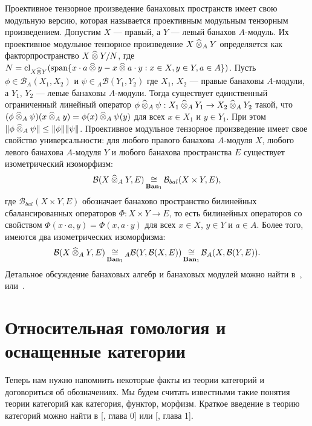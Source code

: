 Проективное тензорное произведение банаховых пространств имеет свою модульную
версию, которая называется проективным модульным тензорным произведением.
Допустим $X$ --- правый, а $Y$ --- левый банахов $A$-модуль. Их проективное
модульное тензорное произведение  $X\mathbin{\widehat{\otimes}}_{A}Y$ определяется как
факторпространство $X\mathbin{\widehat{\otimes}} Y / N$, где $N=\operatorname{cl}_{X\mathbin{\widehat{\otimes}}
Y}(\operatorname{span}\{x\cdot a\mathbin{\widehat{\otimes}} y-x\mathbin{\widehat{\otimes}} a\cdot y:x\in X,y\in
Y,a\in A\})$. Пусть $\phi\in\mathcal{B}_A(X_1,X_2)$ и
$\psi\in{}_A\mathcal{B}(Y_1,Y_2)$ где $X_1$, $X_2$ --- правые банаховы
$A$-модули, а $Y_1$, $Y_2$ --- левые банаховы $A$-модули. Тогда существует
единственный ограниченный линейный оператор $\phi\mathbin{\widehat{\otimes}}_{A}
\psi:X_1\mathbin{\widehat{\otimes}}_{A} Y_1\to X_2\mathbin{\widehat{\otimes}}_{A} Y_2$ такой, что
$(\phi\mathbin{\widehat{\otimes}}_{A} \psi)(x\mathbin{\widehat{\otimes}}_{A} y)=\phi(x)\mathbin{\widehat{\otimes}}_{A} \psi(y)$
для всех $x\in X_1$ и $y\in Y_1$. При этом $\Vert \phi\mathbin{\widehat{\otimes}}_{A}
\psi\Vert\leq\Vert \phi\Vert\Vert \psi\Vert$. Проективное модульное тензорное
произведение имеет свое свойство универсальности: для любого правого банахова
$A$-модуля $X$, любого левого банахова $A$-модуля $Y$ и любого банахова
пространства $E$ существует изометрический изоморфизм:
$$
\mathcal{B}(X\mathbin{\widehat{\otimes}}_{A}Y,E)
\mathop{\mathbin{\cong}}\limits_{\mathbf{Ban}_1}\mathcal{B}_{bal}(X\times Y, E),
$$
где $\mathcal{B}_{bal}(X\times Y, E)$ обозначает банахово пространство
билинейных сбалансированных операторов $\Phi:X\times Y\to E$, то есть билинейных
операторов со свойством $\Phi(x\cdot a,y)=\Phi(x,a\cdot y)$ для всех $x\in X$,
$y\in Y$ и $a\in A$. Более того, имеются два изометрических изоморфизма:
$$
\mathcal{B}(X\mathbin{\widehat{\otimes}}_{A}Y,E)
\mathop{\mathbin{\cong}}\limits_{\mathbf{Ban}_1}
{}_A\mathcal{B}(Y,\mathcal{B}(X,E))
\mathop{\mathbin{\cong}}\limits_{\mathbf{Ban}_1}
\mathcal{B}_A(X,\mathcal{B}(Y,E)).
$$
Детальное обсуждение банаховых алгебр и банаховых модулей можно найти
в~\cite{HelBanLocConvAlg},~\cite{HelHomolBanTopAlg} или~\cite{DalBanAlgAutCont}.


\section{Относительная гомология и оснащенные
    категории}\label{SectionRelativeHomologyAndRiggedCategories}

Теперь нам нужно напомнить некоторые факты из теории категорий и договориться об
обозначениях. Мы будем считать известными такие понятия теории категорий как
категория, функтор, морфизм. Краткое  введение в теорию категорий можно найти в
[\cite{HelLectAndExOnFuncAn}, глава 0] или [\cite{KashivShapCatsAndSheavs},
глава 1].

